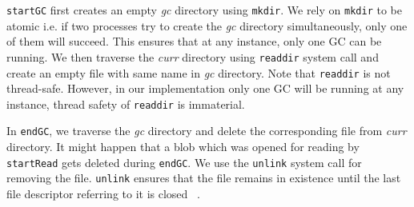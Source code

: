 \texttt{startGC} first creates an empty \textit{gc} directory using \texttt{mkdir}. We rely on \texttt{mkdir} to be atomic i.e. if two processes try to create the \textit{gc} directory simultaneously, only one of them will succeed.
This ensures that at any instance, only one GC can be running.
We then traverse the \textit{curr} directory using \texttt{readdir} system call and create an empty file with same name in \textit{gc} directory. Note that \texttt{readdir} is not thread-safe. However, in our implementation only one GC will be running at any instance, thread safety of \texttt{readdir} is immaterial.

In \texttt{endGC}, we traverse the \textit{gc} directory and delete the corresponding file from \textit{curr} directory. It might happen that a blob which was opened for reading by \texttt{startRead} gets deleted during \texttt{endGC}.
We use the \texttt{unlink} system call for removing the file. \texttt{unlink} ensures that the file remains in existence until the last file descriptor referring to it is closed ~\cite{unlinkmanpage}.
